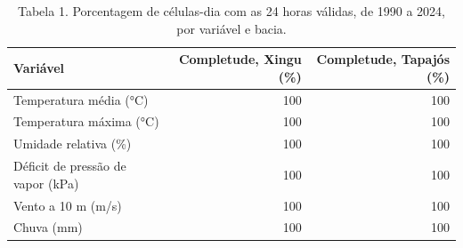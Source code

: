 \begin{table}
\caption{Tabela 1. Porcentagem de células-dia com as 24 horas válidas, de 1990 a 2024, por variável e bacia.}
\label{tab:03_clima::completude}
\begin{tabular}{lrr}
\toprule
Variável & Completude, Xingu (\%) & Completude, Tapajós (\%) \\
\midrule
Temperatura média (°C) & 100 & 100 \\
Temperatura máxima (°C) & 100 & 100 \\
Umidade relativa (\%) & 100 & 100 \\
Déficit de pressão de vapor (kPa) & 100 & 100 \\
Vento a 10 m (m/s) & 100 & 100 \\
Chuva (mm) & 100 & 100 \\
\bottomrule
\end{tabular}
\end{table}
